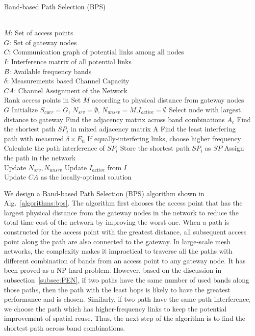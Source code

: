 \begin{algorithm}[t]
    \small
\caption{Band-based Path Selection (BPS)}
\begin{algorithmic}[1]
\label{algorithms:bps}
\REQUIRE  ~~\\
	$M$: Set of access points\\
	$G$: Set of gateway nodes\\
	$C$: Communication graph of potential links among all nodes\\
	$I$: Interference matrix of all potential links \\
	$B$: Available frequency bands \\
	$\delta$: Measurements based Channel Capacity
\ENSURE ~~\\    
$CA$: Channel Assignment of the Network\\
\STATE Rank access points in Set $M$ according to physical distance from gateway nodes $G$
\STATE Initialize $S_{curr}=G$, $N_{srv}=\emptyset$, $N_{unsrv}=M$,$I_{active}=\emptyset$
\STATE Select node with largest distance to gateway
\STATE Find the adjacency matrix across band combinations $A_c$
\STATE Find the shortest path $SP_i$ in mixed adjacency matrix A 
\STATE Find the least interfering path with measured $\delta \times E_n$
\STATE If equally-interfering links, choose higher frequency
\STATE Calculate the path interference of $SP_i$
\ENDFOR
\STATE Store the shortest path $SP_i$ as $SP$
\ENDFOR
\STATE Assign the path in the network\\
		\STATE Update $N_{srv},N_{unsrv}$
		\STATE Update $I_{active}$ from $I$
\ENDWHILE \\
Update $CA$ as the locally-optimal solution\\
\end{algorithmic}
\end{algorithm}



We design a Band-based Path Selection (BPS) algorithm shown in Alg.~\ref{algorithms:bps}. 
The algorithm first chooses the access point that has the largest physical distance from the 
gateway nodes in the network to reduce the total time cost of the network by improving the 
worst one. When a path is constructed for the access point with the greatest distance, all 
subsequent access point along the path are also connected to the gateway. 
In large-scale mesh networks, the complexity makes it impractical to traverse all the 
paths with different combination of bands from an access point to any gateway node. It has been 
proved as a NP-hard problem. However, based on the discussion in subsection~\ref{subsec:PEN}, 
if two paths have the same number of used bands along those paths, then the path with the 
least hops is likely to have the greatest performance and is chosen. Similarly, if two path 
have the same path interference, we choose the path which has higher-frequency links to keep 
the potential improvement of spatial reuse. Thus, the next step of the algorithm is to find 
the shortest path across band combinations.

